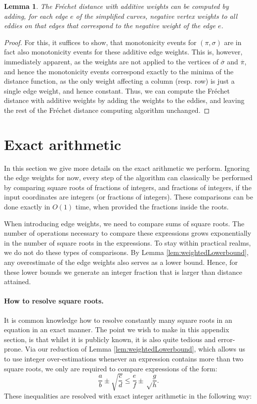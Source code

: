 \documentclass[10pt,a4paper]{article}
\newtheorem{lemma}[theorem]{Lemma}
\begin{document}
\begin{lemma}
    The Fréchet distance with additive weights can be computed by adding, for each edge $e$ of the simplified curves, negative vertex weights to all eddies on that edges that correspond to the negative weight of the edge $e$. 
\end{lemma}
\begin{proof}
    For this, it suffices to show, that monotonicity events for $(\pi, \sigma)$ are in fact also monotonicity events for these additive edge weights. This is, however, immediately apparent, as the weights are not applied to the vertices of $\overline{\sigma}$ and $\overline{\pi}$, and hence the monotonicity events correspond exactly to the minima of the distance function, as the only weight affecting a column (resp. row) is just a single edge weight, and hence constant. Thus, we can compute the Fréchet distance with additive weights by adding the weights to the eddies, and leaving the rest of the Fréchet distance computing algorithm unchanged.
\end{proof}




\section{Exact arithmetic}
\label{sec:exact}
    In this section we give more details on the exact arithmetic we perform. Ignoring the edge weights for now, every step of the algorithm can classically be performed by comparing square roots of fractions of integers, and fractions of integers, if the input coordinates are integers (or fractions of integers). These comparisons can be done exactly in $O(1)$ time, when provided the fractions inside the roots.

    When introducing edge weights, we need to compare sums of square roots. The number of operations necessary to compare these expressions grows exponentially in the number of square roots in the expressions. To stay within practical realms, we do not do these types of comparisons. By Lemma \ref{lem:weightedLowerbound}, any overestimate of the edge weights also serves as a lower bound. Hence, for these lower bounds we generate an integer fraction that is larger than distance attained.
    
    
    \paragraph*{How to resolve square roots.}
    It is common knowledge how to resolve constantly many square roots in an equation in an exact manner.
    The point we wish to make in this appendix section, is that whilst it is publicly known, it is also quite tedious and error-prone.
    Via our reduction of Lemma \ref{lem:weightedLowerbound}, which allows us to use integer over-estimations whenever an expression contains more than two square roots, we only are required to compare expressions of the form:  \[\frac{a}{b}\pm\sqrt{\frac{c}{d}}\leq\frac{e}{f}\pm\sqrt\frac{g}{h}.\]
    These inequalities are  resolved with exact integer arithmetic in the following way:
    
\end{document}
